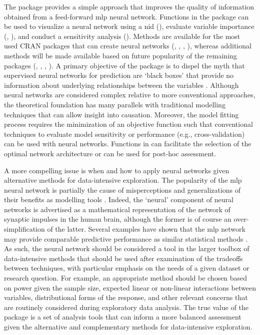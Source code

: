 \documentclass[article,shortnames]{jss}\usepackage[]{graphicx}\usepackage[]{color}
\begin{document}
The  package provides a simple approach that improves the quality of information obtained from a feed-forward \ac{mlp} neural network.  Functions in the package can be used to visualize a neural network using a \acl{nid} (), evaluate variable importance (, ), and conduct a sensitivity analysis ().  Methods are available for the most used \ac{CRAN} packages that can create neural networks (, , , ), whereas additional methods will be made available based on future popularity of the remaining packages (, , , ).  A primary objective of the package is to dispel the myth that supervised neural networks for prediction are `black boxes' that provide no information about underlying relationships between the variables \citep{Paruelo97,Olden02}.  Although neural networks are considered complex relative to more conventional approaches, the theoretical foundation has many parallels with traditional modelling techniques that can allow insight into causation.  Moreover, the model fitting process requires the minimization of an objective function such that conventional techniques to evaluate model sensitivity or performance (e.g., cross-validation) can be used with neural networks.  Functions in  can facilitate the selection of the optimal network architecture or can be used for post-hoc assessment. 

A more compelling issue is when and how to apply neural networks given alternative methods for data-intensive exploration.  The popularity of the \ac{mlp} neural network is partially the cause of misperceptions and generalizations of their benefits as modelling tools \citep{Burke97}. Indeed, the `neural' component of neural networks is advertised as a mathematical representation of the network of synaptic impulses in the human brain, although the former is of course an over-simplification of the latter.  Several examples have shown that the \ac{mlp} network may provide comparable predictive performance as similar statistical methods \citep{Feng02,Razi05,Beck14a}.  As such, the neural network should be considered a tool in the larger toolbox of data-intensive methods that should be used after examination of the tradeoffs between techniques, with particular emphasis on the needs of a given dataset or research question.  For example, an appropriate method should be chosen based on power given the sample size, expected linear or non-linear interactions between variables, distributional forms of the response, and other relevant concerns that are routinely considered during exploratory data analysis.  The true value of the  package is a set of analysis tools that can inform a more balanced assessment given the alternative and complementary methods for data-intensive exploration.
\end{document}
